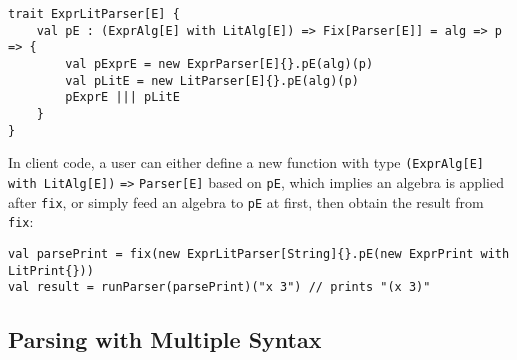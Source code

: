 \begin{lstlisting}
trait ExprLitParser[E] {
    val pE : (ExprAlg[E] with LitAlg[E]) => Fix[Parser[E]] = alg => p => {
        val pExprE = new ExprParser[E]{}.pE(alg)(p)
        val pLitE = new LitParser[E]{}.pE(alg)(p)
        pExprE ||| pLitE
    }
}
\end{lstlisting}

In client code, a user can either define a new function with type \lstinline{(ExprAlg[E] with LitAlg[E])} \lstinline{=>} \lstinline{Parser[E]} based on \lstinline{pE}, which implies an algebra is applied after \lstinline{fix}, or simply feed an algebra to \lstinline{pE} at first, then obtain the result from \lstinline{fix}:
\begin{lstlisting}
val parsePrint = fix(new ExprLitParser[String]{}.pE(new ExprPrint with LitPrint{}))
val result = runParser(parsePrint)("x 3") // prints "(x 3)"
\end{lstlisting}

\subsection{Parsing with Multiple Syntax}\label{subsec:differentsyntax}

